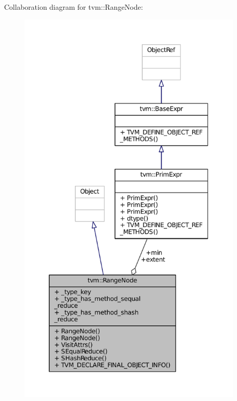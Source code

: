 Collaboration diagram for tvm\+:\+:Range\+Node\+:
\nopagebreak
\begin{figure}[H]
\begin{center}
\leavevmode
\includegraphics[height=550pt]{classtvm_1_1RangeNode__coll__graph}
\end{center}
\end{figure}
